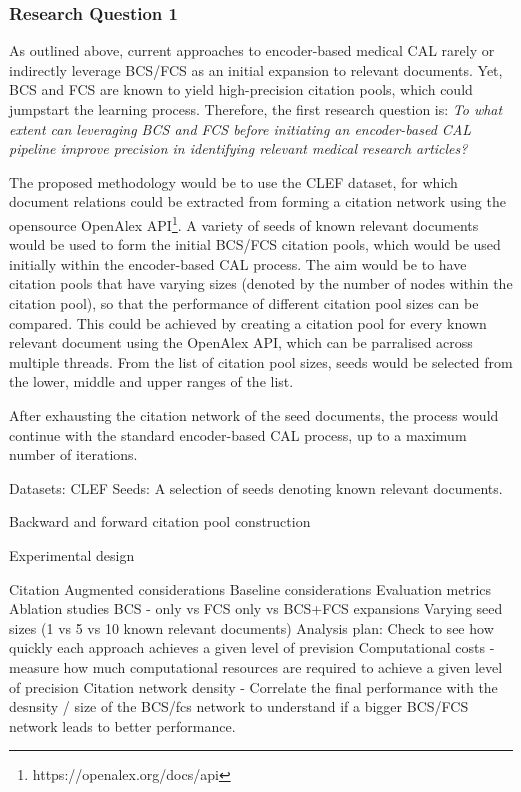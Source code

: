 \documentclass[../main.tex]{subfiles}
\begin{document}
\subsubsection{Research Question 1}

As outlined above, current approaches to encoder-based medical CAL rarely or indirectly leverage BCS/FCS as an initial expansion to relevant documents. Yet, BCS and FCS are known to yield high-precision citation pools, which could jumpstart the learning process. Therefore, the first research question is: {\it{To what extent can leveraging BCS and FCS before initiating an encoder-based CAL pipeline improve precision in identifying relevant medical research articles?}}

The proposed methodology would be to use the CLEF dataset, for which document relations could be extracted from forming a citation network using the opensource OpenAlex API\footnote{https://openalex.org/docs/api}. A variety of seeds of known relevant documents would be used to form the initial BCS/FCS citation pools, which would be used initially within the encoder-based CAL process. The aim would be to have citation pools that have varying sizes (denoted by the number of nodes within the citation pool), so that the performance of different citation pool sizes can be compared. This could be achieved by creating a citation pool for every known relevant document using the OpenAlex API, which can be parralised across multiple threads. From the list of citation pool sizes, seeds would be selected from the lower, middle and upper ranges of the list. 

After exhausting the citation network of the seed documents, the process would continue with the standard encoder-based CAL process, up to a maximum number of iterations. 



Datasets: CLEF
Seeds: A selection of seeds denoting known relevant documents.

Backward and forward citation pool construction


Experimental design

Citation Augmented considerations
Baseline considerations
Evaluation metrics
Ablation studies
BCS - only vs FCS only vs BCS+FCS expansions
Varying seed sizes (1 vs 5 vs 10 known relevant documents)
Analysis plan: 
Check to see how quickly each approach achieves a given level of prevision
Computational costs - measure how much computational resources are required to achieve a given level of precision
Citation network density - Correlate the final performance with the desnsity / size of the BCS/fcs network to understand if a bigger BCS/FCS network leads to better performance.
\end{document}
